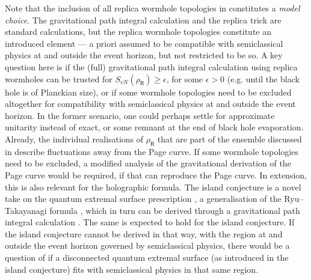 \documentclass[11pt]{article}
\numberwithin{equation}{section}
\begin{document}
Note that the inclusion of all replica wormhole topologies in \cite{Penington:2019kki,Almheiri:2019qdq} constitutes a \emph{model choice}. The gravitational path integral calculation and the replica trick are standard calculations, but the replica wormhole topologies constitute an introduced element --- a priori assumed to be compatible with semiclassical physics at and outside the event horizon, but not restricted to be so. A key question here is if the (full) gravitational path integral calculation using replica wormholes can be trusted for $S_{vN}(\rho_\textsf{R})\geq\epsilon$, for some $\epsilon>0$ (e.g. until the black hole is of Planckian size), or if some wormhole topologies need to be excluded altogether for compatibility with semiclassical physics at and outside the event horizon. In the former scenario, one could perhaps settle for approximate unitarity instead of exact, or some remnant at the end of black hole evaporation. Already, the individual realisations of $\rho_\textsf{R}$ that are part of the ensemble discussed in \cite{Penington:2019kki} describe fluctuations away from the Page curve. If some wormhole topologies need to be excluded, a modified analysis of the gravitational derivation of the Page curve would be required, if that can reproduce the Page curve. In extension, this is also relevant for the holographic formula. The island conjecture is a novel take on the quantum extremal surface prescription \cite{Engelhardt:2014gca}, a generalisation of the Ryu--Takayanagi formula \cite{Ryu:2006bv,Hubeny:2007xt}, which in turn can be derived through a gravitational path integral calculation \cite{Lewkowycz:2013nqa,Faulkner:2013ana,Dong:2016hjy,Dong:2017xht}. The same is expected to hold for the island conjecture. If the island conjecture cannot be derived in that way, with the region at and outside the event horizon governed by semiclassical physics, there would be a question of if a disconnected quantum extremal surface (as introduced in the island conjecture) fits with semiclassical physics in that same region.
\end{document}
